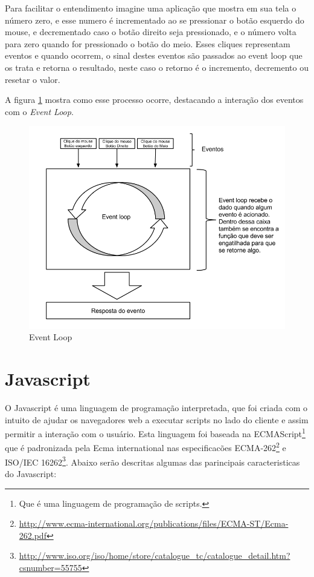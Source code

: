 Para facilitar o entendimento imagine uma aplicação que mostra em sua tela o número zero, e esse numero é incrementado ao se pressionar o botão esquerdo do mouse, e decrementado caso o botão direito seja pressionado, e o número volta para zero quando for pressionado o botão do meio. Esses cliques representam eventos e quando ocorrem, o sinal destes eventos são passados ao event loop que os trata e retorna o resultado, neste caso o retorno é o incremento, decremento ou resetar o valor.

A figura \ref{fig:event loop} mostra como esse processo ocorre, destacando a interação dos eventos com o \textit{Event Loop}.

\begin{figure}[htb]
\centering
\includegraphics[scale=0.6]{images/event_loop_diagram.png}
\caption{Event Loop}
\label{fig:event loop}
\end{figure}

\newpage

\section{Javascript}
\label{sec: Javascript}
O Javascript  é uma linguagem de programação interpretada, que foi criada com o intuito de ajudar os navegadores web a executar scripts no lado do cliente e assim permitir a interação com o usuário\nocite{jsGood}. Esta linguagem foi baseada na ECMAScript\footnote{Que  é uma linguagem de programação de scripts.} que é padronizada pela Ecma international nas especificacões ECMA-262\footnote{\url{http://www.ecma-international.org/publications/files/ECMA-ST/Ecma-262.pdf}} e ISO/IEC 16262\footnote{\url{http://www.iso.org/iso/home/store/catalogue_tc/catalogue_detail.htm?csnumber=55755}}. Abaixo serão descritas algumas das parincipais caracteristicas do Javascript:

